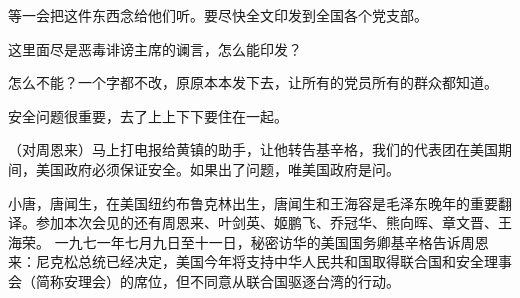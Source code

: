 等一会把这件东西念给他们听。要尽快全文印发到全国各个党支部。

这里面尽是恶毒诽谤主席的谰言，怎么能印发？

怎么不能？一个字都不改，原原本本发下去，让所有的党员所有的群众都知道。

安全问题很重要，去了上上下下要住在一起。

（对周恩来）马上打电报给黄镇的助手，让他转告基辛格，我们的代表团在美国期间，美国政府必须保证安全。如果出了问题，唯美国政府是问。

\begin{maonote}
小唐，唐闻生，在美国纽约布鲁克林出生，唐闻生和王海容是毛泽东晚年的重要翻译。参加本次会见的还有周恩来、叶剑英、姬鹏飞、乔冠华、熊向晖、章文晋、王海荣。
一九七一年七月九日至十一日，秘密访华的美国国务卿基辛格告诉周恩来：尼克松总统已经决定，美国今年将支持中华人民共和国取得联合国和安全理事会（简称安理会）的席位，但不同意从联合国驱逐台湾的行动。


\end{maonote}
